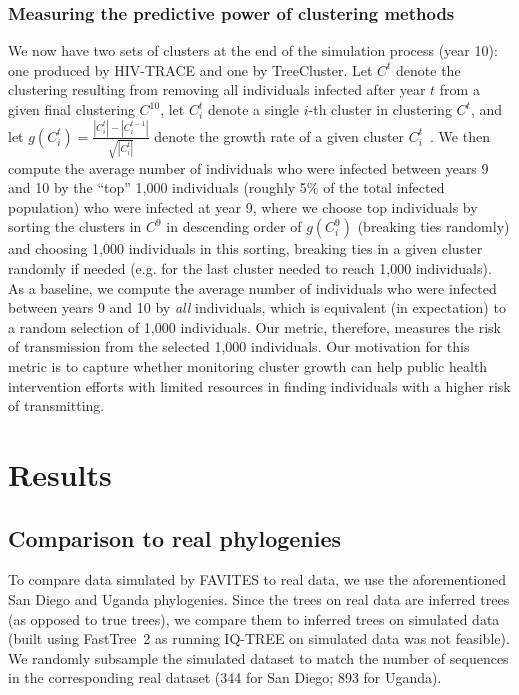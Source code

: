 \subsubsection{Measuring the predictive power of clustering methods} We now have two sets of clusters at the end of the simulation process (year 10): one produced by HIV-TRACE and one by TreeCluster. Let $C^t$ denote the clustering resulting from removing all individuals infected after year $t$ from a given final clustering $C^{10}$, let $C^t_i$ denote a single $i$-th cluster in clustering $C^t$, and let $g(C^t_i) = \frac{\left\lvert C^t_i \right\rvert - \left\lvert C^{t-1}_i \right\rvert}{\sqrt{\left\lvert C^t_i \right\rvert}}$ denote the growth rate of a given cluster $C^t_i$~\cite{Wertheim2018}. We then compute the average number of individuals who were infected between years 9 and 10 by the ``top'' 1,000 individuals (roughly 5\% of the total infected population) who were infected at year 9, where we choose top individuals by sorting the clusters in $C^9$ in descending order of $g(C^9_i)$ (breaking ties randomly) and choosing 1,000 individuals in this sorting, breaking ties in a given cluster randomly if needed (e.g. for the last cluster needed to reach 1,000 individuals). As a baseline, we compute the average number of individuals who were infected between years 9 and 10 by \textit{all} individuals, which is equivalent (in expectation) to a random selection of 1,000 individuals. Our metric, therefore, measures the risk of transmission from the selected 1,000 individuals. Our motivation for this metric is to capture whether monitoring cluster growth can help public health intervention efforts with limited resources in finding individuals with a higher risk of transmitting.

\section{Results}
\subsection{Comparison to real phylogenies} To compare data simulated by FAVITES to real data, we use the aforementioned San Diego and Uganda phylogenies. Since the trees on real data are inferred trees (as opposed to true trees), we compare them to inferred trees on simulated data (built using FastTree~2 as running IQ-TREE on simulated data was not feasible). We randomly subsample the simulated dataset to match the number of sequences in the corresponding real dataset (344 for San Diego; 893 for Uganda).

